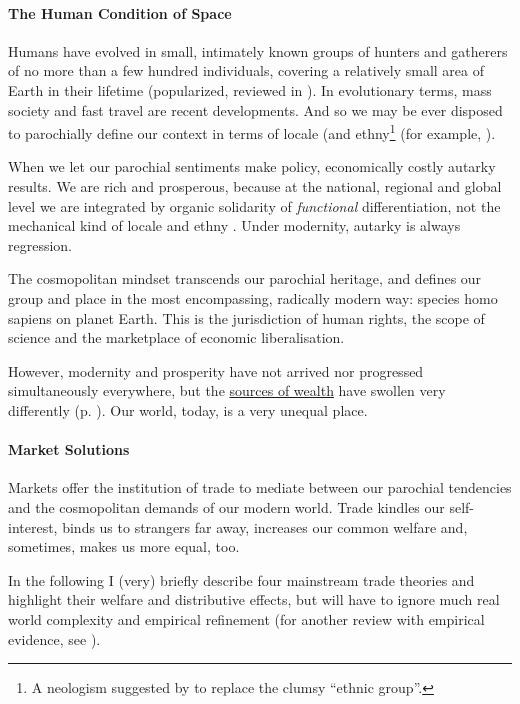 \paragraph{The Human Condition of Space} Humans have evolved in small, intimately known groups of hunters and gatherers of no more than a few hundred individuals, covering a relatively small area of Earth in their lifetime (popularized, reviewed in \citealt{Diamond1997}). In evolutionary terms, mass society and fast travel are recent developments. And so we may be ever disposed to parochially define our context in terms of locale (and ethny\footnote{
	A neologism suggested by \citeauthor{Van-den-Berghe-1981-aa} to replace the clumsy ``ethnic group''.}
(for example, \citealt{Van-den-Berghe-1981-aa}).

When we let our parochial sentiments make policy, economically costly autarky results. We are rich and prosperous, because at the national, regional and global level we are integrated by organic solidarity of \emph{functional} differentiation, not the mechanical kind of locale and ethny \citep{Durkheim-1893-aa}. Under modernity, autarky is always regression.

The cosmopolitan mindset transcends our parochial heritage, and defines our group and place in the most encompassing, radically modern way: species homo sapiens on planet Earth. This is the jurisdiction of human rights, the scope of science and the marketplace of economic liberalisation.

However, modernity and prosperity have not arrived nor progressed simultaneously everywhere, but the  \hyperref[sec:sourcesofwealth]{sources of wealth} have swollen very differently (p. \pageref{sec:sourcesofwealth}). Our world, today, is a very unequal place. 

\paragraph{Market Solutions}  \label{sec:trade} Markets offer the institution of trade to mediate between our parochial tendencies and the cosmopolitan demands of our modern world. Trade kindles our self-interest, binds us to strangers far away, increases our common welfare and, sometimes, makes us more equal, too. %

In the following I (very) briefly describe four mainstream trade theories and highlight their welfare and distributive effects, but will have to ignore much real world complexity and empirical refinement (for another review with empirical evidence, see \citealt{Beckfield2009}).


